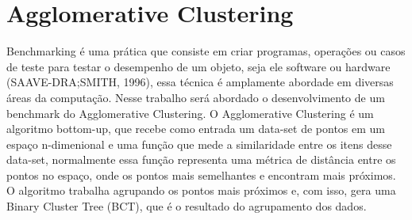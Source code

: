 \usepackage[latin1]{inputenc} %
\usepackage{graphicx} %

\hypersetup{
    hidelinks, %
    unicode=true,   %
    linktoc=all %
}

\chapter{Agglomerative Clustering}
	Benchmarking é uma prática que consiste em criar programas, operações ou casos de teste para testar o desempenho de um objeto, seja ele software ou hardware (SAAVE-DRA;SMITH, 1996), essa técnica é amplamente abordade em diversas áreas da computação. Nesse trabalho será abordado o desenvolvimento de um benchmark do Agglomerative Clustering.
	O Agglomerative Clustering é um algoritmo bottom-up, que recebe como entrada um data-set de pontos em um espaço n-dimenional e uma função que mede a similaridade entre os itens desse data-set, normalmente essa função representa uma métrica de distância entre os pontos no espaço, onde os pontos mais semelhantes e encontram mais próximos.
	O algoritmo trabalha agrupando os pontos mais próximos e, com isso, gera uma Binary Cluster Tree (BCT), que é o resultado do agrupamento dos dados.

